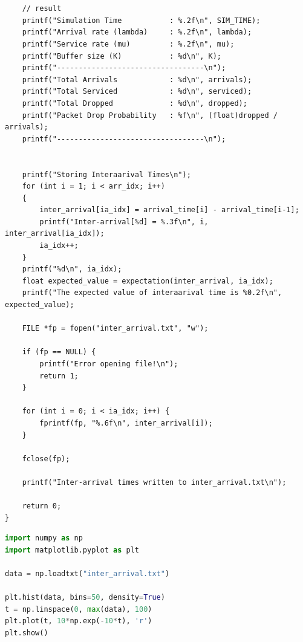 \documentclass[a4paper,12pt]{article}
\begin{document}
\begin{lstlisting}
    

    // result
    printf("Simulation Time           : %.2f\n", SIM_TIME);
    printf("Arrival rate (lambda)     : %.2f\n", lambda);
    printf("Service rate (mu)         : %.2f\n", mu);
    printf("Buffer size (K)           : %d\n", K);
    printf("----------------------------------\n");
    printf("Total Arrivals            : %d\n", arrivals);
    printf("Total Serviced            : %d\n", serviced);
    printf("Total Dropped             : %d\n", dropped);
    printf("Packet Drop Probability   : %f\n", (float)dropped / arrivals);
    printf("----------------------------------\n");
    
    
    printf("Storing Interaarival Times\n");
    for (int i = 1; i < arr_idx; i++) 
    {   
        inter_arrival[ia_idx] = arrival_time[i] - arrival_time[i-1];
        printf("Inter-arrival[%d] = %.3f\n", i, inter_arrival[ia_idx]);
        ia_idx++;
    }
    printf("%d\n", ia_idx);
    float expected_value = expectation(inter_arrival, ia_idx);
    printf("The expected value of interaarival time is %0.2f\n", expected_value);

    FILE *fp = fopen("inter_arrival.txt", "w");

    if (fp == NULL) {
        printf("Error opening file!\n");
        return 1;
    }

    for (int i = 0; i < ia_idx; i++) {
        fprintf(fp, "%.6f\n", inter_arrival[i]);
    }

    fclose(fp);

    printf("Inter-arrival times written to inter_arrival.txt\n");

    return 0;
}

\end{lstlisting}

\begin{lstlisting}[language=Python, caption=Python code for plotting the interarrival time]
import numpy as np
import matplotlib.pyplot as plt

data = np.loadtxt("inter_arrival.txt")

plt.hist(data, bins=50, density=True)
t = np.linspace(0, max(data), 100)
plt.plot(t, 10*np.exp(-10*t), 'r')
plt.show()
\end{lstlisting}
\end{document}
